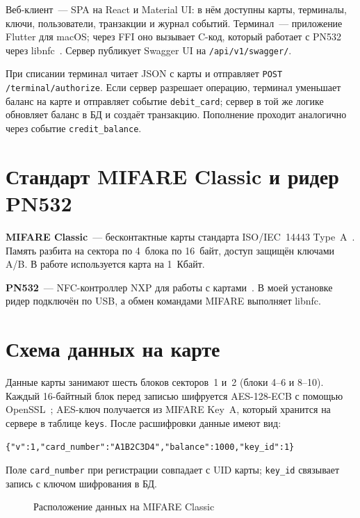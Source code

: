 \documentclass[language=russian]{bmstu}
\begin{document}
Веб-клиент~--- SPA на React и Material UI: в нём доступны карты, терминалы, ключи, пользователи, транзакции и журнал событий.
Терминал~--- приложение Flutter для macOS; через FFI оно вызывает C-код, который работает с PN532 через libnfc~\cite{libnfc}.
Сервер публикует Swagger UI на \texttt{/api/v1/swagger/}.

При списании терминал читает JSON с карты и отправляет \texttt{POST /terminal/authorize}.
Если сервер разрешает операцию, терминал уменьшает баланс на карте и отправляет событие \texttt{debit\_card}; сервер в той же логике обновляет баланс в БД и создаёт транзакцию.
Пополнение проходит аналогично через событие \texttt{credit\_balance}.

\section{Стандарт MIFARE Classic и ридер PN532}

\textbf{MIFARE Classic}~--- бесконтактные карты стандарта ISO/IEC~14443 Type~A~\cite{mifare_classic}.
Память разбита на сектора по 4~блока по 16~байт, доступ защищён ключами A/B.
В работе используется карта на 1~Кбайт.

\textbf{PN532}~--- NFC-контроллер NXP для работы с картами~\cite{pn532}.
В моей установке ридер подключён по USB, а обмен командами MIFARE выполняет libnfc.

\section{Схема данных на карте}

Данные карты занимают шесть блоков секторов~1 и~2 (блоки 4--6 и 8--10).
Каждый 16-байтный блок перед записью шифруется AES-128-ECB с помощью OpenSSL~\cite{openssl}; AES-ключ получается из MIFARE Key~A, который хранится на сервере в таблице \texttt{keys}.
После расшифровки данные имеют вид:
\begin{verbatim}
{"v":1,"card_number":"A1B2C3D4","balance":1000,"key_id":1}
\end{verbatim}
Поле \texttt{card\_number} при регистрации совпадает с UID карты; \texttt{key\_id} связывает запись с ключом шифрования в БД.

\begin{figure}[H]
  \centering
  \caption{Расположение данных на MIFARE Classic}
  \label{fig:card-blocks}
\end{figure}
\end{document}
